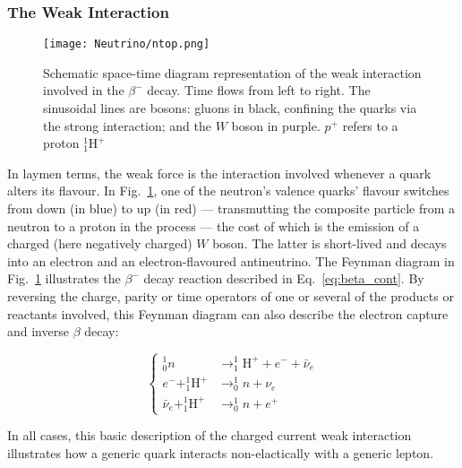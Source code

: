 \subsubsection{The Weak Interaction}

\begin{figure}
\begin{center}
\texttt{[image: Neutrino/ntop.png]}
\caption{Schematic space-time diagram representation of the weak interaction involved in the $\beta^{-}$ decay. Time flows from left to right. The sinusoidal lines are bosons: gluons in black, confining the quarks via the strong interaction; and the $W$ boson in purple. $p^{+}$ refers to a proton $^{1}_{1}\mathrm{H}^{+}$}
\label{fig:weakcurrent}
\end{center}
\end{figure}

In laymen terms, the weak force is the interaction involved whenever a quark alters its flavour. In Fig.~\ref{fig:weakcurrent}, one of the neutron's valence quarks' flavour switches from down (in blue) to up (in red) --- transmutting the composite particle from a neutron to a proton in the process --- the cost of which is the emission of a charged (here negatively charged) $W$ boson. The latter is short-lived and decays into an electron and an electron-flavoured antineutrino. The Feynman diagram in Fig.~\ref{fig:weakcurrent} illustrates the $\beta^{-}$ decay reaction described in Eq.~\ref{eq:beta_cont}. By reversing the charge, parity or time operators of one or several of the products or reactants involved, this Feynman diagram can also describe the electron capture and inverse $\beta$ decay:

\begin{equation}
\label{eq:three_reactions}
\left\{  
\begin{array}{rl}
^{1}_{0}n &\longrightarrow ^{1}_{1}\mathrm{H}^{+} + e^{-} + \bar{\nu}_e \\
e^{-} + ^{1}_{1}\mathrm{H}^{+} &\longrightarrow ^{1}_{0}n + \nu_e \\
\bar{\nu}_e + ^{1}_{1}\mathrm{H}^{+} &\longrightarrow ^{1}_{0}n + e^{+}
\end{array}
\right.
\end{equation}

In all cases, this basic description of the charged current weak interaction illustrates how a generic quark interacts non-elactically with a generic lepton.

